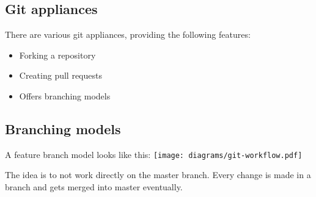\subsection{Git appliances}
\begin{frame}[fragile]
  \subslidetitle
  There are various git appliances, providing the following features:
  \begin{itemize}
    \item Forking a repository
    \item Creating pull requests
    \item Offers branching models
  \end{itemize}
\end{frame}

\subsection{Branching models}
\begin{frame}[fragile]
  \subslidetitle
  A feature branch model looks like this:
  \center \texttt{[image: diagrams/git-workflow.pdf]}

  \vspace{2em}
  The idea is to not work directly on the master branch. Every change is made in a branch and gets merged into master eventually.
\end{frame}
